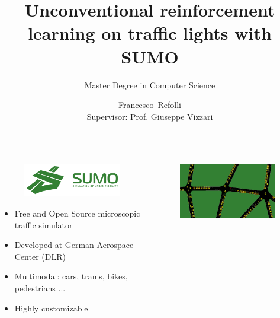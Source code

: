 \documentclass{beamer}
\date[26 September 2025]{}
\title[Patrick, we fixed traffic!]{Unconventional reinforcement learning on traffic lights with SUMO}
\subtitle{Master Degree in Computer Science}
\author[RF 865955]{Francesco~Refolli\\[10mm]{\small Supervisor: Prof. Giuseppe Vizzari}}
\begin{document}
\frame{\titlepage}


\begin{frame}
  \begin{columns}
    \begin{column}{0.4\textwidth}
      \begin{figure}
        \centering
        \includegraphics[width=1.0\textwidth]{figures/sumo-logo.png}
      \end{figure}
      \begin{itemize}
        \item Free and Open Source microscopic traffic simulator
        \item Developed at German Aerospace Center (DLR)
        \item Multimodal: cars, trams, bikes, pedestrians ...
        \item Highly customizable
      \end{itemize}
    \end{column}
    \begin{column}{0.6\textwidth}
      \begin{figure}
        \centering
        \includegraphics[width=1.0\textwidth]{figures/sumo-example.png}
      \end{figure}
      \begin{figure}

\end{figure}
\end{column}
\end{columns}
\end{frame}
\end{document}
